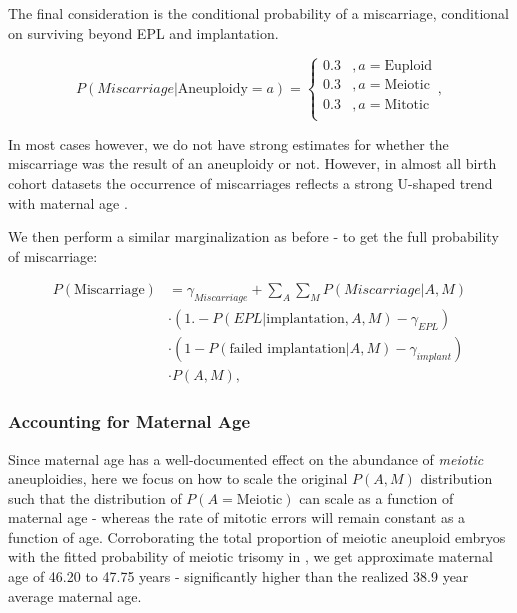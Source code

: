 \documentclass{article}
\begin{document}
The final consideration is the conditional probability of a miscarriage, conditional on surviving beyond EPL and implantation. 

\begin{equation}
	P(Miscarriage | \text{Aneuploidy}=a) = \begin{cases}
	0.3 &, a= \text{Euploid}\\
	0.3 &, a = \text{Meiotic}\\
	0.3 &, a = \text{Mitotic}\\
	\end{cases},
\end{equation}

In most cases however, we do not have strong estimates for whether the miscarriage was the result of an aneuploidy or not. However, in almost all birth cohort datasets the occurrence of miscarriages reflects a strong U-shaped trend  with maternal age \citep{Gruhn2019-al}. 

We then perform a similar marginalization as before - to get the full probability of miscarriage: 

\begin{equation}
\begin{aligned}
P(\text{Miscarriage}) &=  \gamma_{Miscarriage} + \sum_{A}\sum_{M} P(Miscarriage | A,M)\\
&\cdot (1. - P(EPL | \text{implantation}, A, M) - \gamma_{EPL})\\
&\cdot (1 - P(\text{failed implantation} | A, M) - \gamma_{implant})\\ 
&\cdot P(A, M),
\end{aligned}
\end{equation}


\subsubsection*{Accounting for Maternal Age} 

Since maternal age has a well-documented effect on the abundance of \textit{meiotic} aneuploidies, here we focus on how to scale the original $P(A,M)$ distribution such that the distribution of $P(A = \text{Meiotic})$ can scale as a function of maternal age - whereas the rate of mitotic errors will remain constant as a function of age. Corroborating the total proportion of meiotic aneuploid embryos with the fitted probability of meiotic trisomy in \citep{Gruhn2019-al}, we get approximate maternal age of 46.20 to 47.75 years - significantly higher than the realized 38.9 year average maternal age. 
\end{document}
